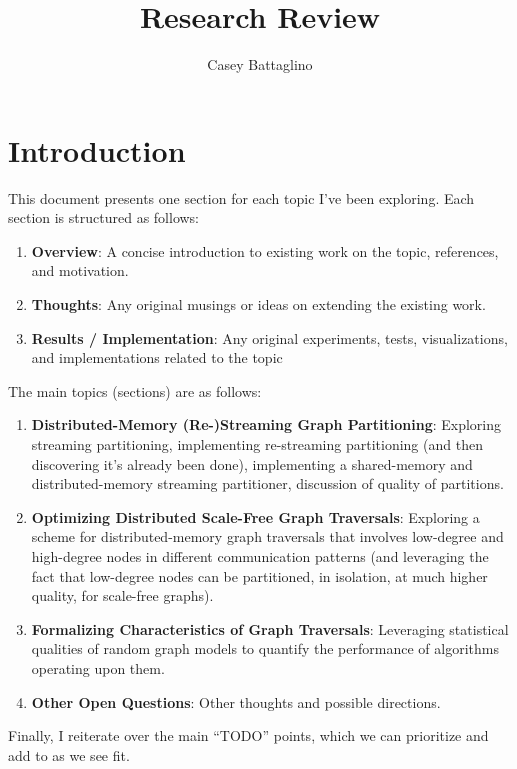 \documentclass[11pt]{article}
\title{Research Review}
\author{Casey Battaglino}
\begin{document}
\maketitle


\section{Introduction}

This document presents one section for each topic I've been exploring. Each section is structured as follows:
\begin{enumerate}
\item \textbf{Overview}: A concise introduction to existing work on the topic, references, and motivation.
\item \textbf{Thoughts}: Any original musings or ideas on extending the existing work.
\item \textbf{Results / Implementation}: Any original experiments, tests, visualizations, and implementations related to the topic
\end{enumerate}

The main topics (sections) are as follows:

\begin{enumerate}
\item \textbf{Distributed-Memory (Re-)Streaming Graph Partitioning}: Exploring streaming partitioning, implementing re-streaming partitioning (and then discovering it's already been done), implementing a shared-memory and distributed-memory streaming partitioner, discussion of quality of partitions. 
\item \textbf{Optimizing Distributed Scale-Free Graph Traversals}: Exploring a scheme for distributed-memory graph traversals that involves low-degree and high-degree nodes in different communication patterns (and leveraging the fact that low-degree nodes can be partitioned, in isolation, at much higher quality, for scale-free graphs). 
\item \textbf{Formalizing Characteristics of Graph Traversals}: Leveraging statistical qualities of random graph models to quantify the performance of algorithms operating upon them. 
\item \textbf{Other Open Questions}: Other thoughts and possible directions.
\end{enumerate}

Finally, I reiterate over the main ``TODO'' points, which we can prioritize and add to as we see fit. 
\end{document}
